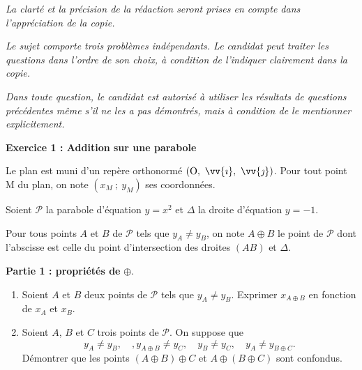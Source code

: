 \documentclass[11pt,a4paper,french]{article}
\def\Oij{$\left(\text{O},~\vv{\imath},~\vv{\jmath}\right)$}
\begin{document}
\vspace{2cm}

\emph{La clarté et la précision de la rédaction seront prises en compte dans l’appréciation de la copie.}

\smallskip

\emph{Le sujet comporte trois problèmes indépendants. Le candidat peut traiter les questions dans l’ordre de son choix, à condition de l’indiquer
clairement dans la copie.}

\smallskip

\emph{Dans toute question, le candidat est autorisé à utiliser les résultats de questions précédentes même s’il ne les a pas démontrés, mais à condition de le mentionner explicitement.}

\newpage
\begin{center}
\textbf{Exercice 1 : Addition sur une parabole}
\end{center}

Le plan est muni d'un repère orthonormé \Oij. Pour tout point M du plan, on note $(x_M~;~ y_M)$ ses coordonnées.

Soient $\mathcal{P}$ la parabole d'équation $y= x^2$ et $\Delta$ la droite d'équation $y =-1$.

Pour tous points $A$ et $B$ de $\mathcal{P}$ tels que $y_A\not=y_B$, on note $A\oplus B$ le point de $\mathcal{P}$ dont l'abscisse est celle du point d'intersection des droites $(AB)$ et $\Delta$.

\begin{center}
\textbf{Partie 1 : propriétés de} $\oplus$. 
\end{center}

\begin{enumerate}
\item Soient $A$ et $B$ deux points de $\mathcal{P}$ tels que $y_A\not= y_B$. Exprimer $x_{A\oplus B}$ en fonction de $x_A$ et $x_B$. 
\item Soient $A$, $B$ et $C$ trois points de $\mathcal{P}$. On suppose que
 \[y_A\not=y_B,\quad, y_{A\oplus B}\not=y_C, \quad y_B\not=y_C,\quad y_A \not= y_{B\oplus C}.\]
 Démontrer que les points $(A\oplus B)\oplus C$ et $A\oplus (B \oplus C) $ sont confondus.
 \end{enumerate}
 
\end{document}
